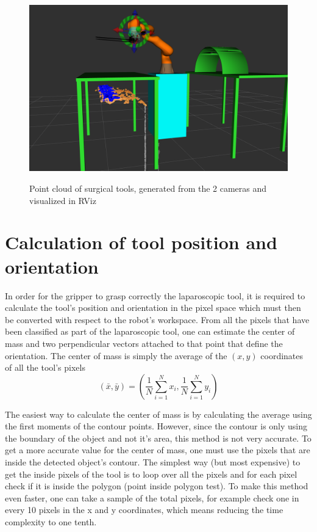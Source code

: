 \begin{center}
\begin{figure}[H]
\centering
\includegraphics[width=12cm]{images/point_cloud.png}\\
\caption{Point cloud of surgical tools, generated from the 2 cameras and visualized in RViz}
\end{figure}
\end{center}

\section{Calculation of tool position and orientation}

In order for the gripper to grasp correctly the laparoscopic tool, it is required to calculate the tool's position and orientation in the pixel space 
which must then be converted with respect to the robot's workspace. From all the pixels that have been classified as part of the laparoscopic tool, 
one can estimate the center of mass and two perpendicular vectors 
attached to that point that define the orientation. The center of mass is simply the average of the $(x,y)$ coordinates of all the tool's pixels
\begin{equation}
\left( \bar{x}, \bar{y} \right) = \left( \frac{1}{N}\sum_{i=1}^{N} x_i , \frac{1}{N}\sum_{i=1}^{N} y_i \right)
\end{equation}

The easiest way to calculate the center of mass is by calculating the average using the first moments of the contour points. However, since the contour is only using
the boundary of the object and not it's area, this method is not very accurate. To get a more accurate value for the center of mass, one must use the pixels that are inside 
the detected object's contour. The simplest way (but most expensive) to get the inside pixels of the tool is to loop over all the pixels and for each pixel check if it is inside the 
polygon (point inside polygon test). To make this method even faster, one can take a sample of the total pixels, for example check one in every 10 pixels in the x and y coordinates, 
which means reducing the time complexity to one tenth. \\

